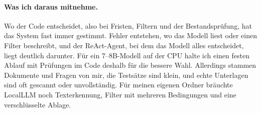 \paragraph{Was ich daraus mitnehme.} Wo der Code entscheidet, also bei Fristen, Filtern und der Bestandsprüfung, hat das System fast immer gestimmt. Fehler entstehen, wo das Modell liest oder einen Filter beschreibt, und der ReAct-Agent, bei dem das Modell alles entscheidet, liegt deutlich darunter. Für ein 7--8B-Modell auf der CPU halte ich einen festen Ablauf mit Prüfungen im Code deshalb für die bessere Wahl. Allerdings stammen Dokumente und Fragen von mir, die Testsätze sind klein, und echte Unterlagen sind oft gescannt oder unvollständig. Für meinen eigenen Ordner bräuchte LocalLLM noch Texterkennung, Filter mit mehreren Bedingungen und eine verschlüsselte Ablage.
